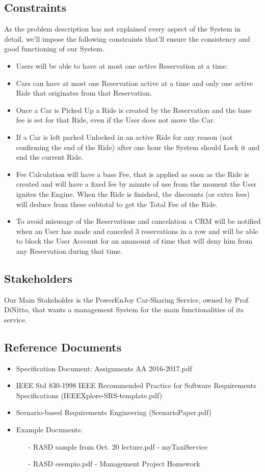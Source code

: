 \documentclass[a4paper]{article}
\begin{document}
\subsection{Constraints}
As the problem description has not explained every aspect of the System in detail, we'll impose the following constraints that'll ensure the consistency and good functioning of our System.
\begin{itemize} 
\item Users will be able to have at most one active Reservation at a time.
\item Cars can have at most one Reservation active at a time and only one active Ride that originates from that Reservation.
\item Once a Car is Picked Up a Ride is created by the Reservation and the base fee is set for that Ride, even if the User does not move the Car.
\item If a Car is left parked Unlocked in an active Ride for any reason (not confirming the end of the Ride) after one hour the System should Lock it and end the current Ride.
\item Fee Calculation will have a base Fee, that is applied as soon as the Ride is created and will have a fixed fee by minute of use from the moment the User ignites the Engine. When the Ride is finished, the discounts (or extra fees) will deduce from these subtotal to get the Total Fee of the Ride.
\item To avoid misusage of the Reservations and cancelation a CRM will be notified when an User has made and canceled 3 reservations in a row and will be able to block the User Account for an ammount of time that will deny him from any Reservation during that time.

\end{itemize}

\subsection{Stakeholders}
Our Main Stakeholder is the PowerEnJoy Car-Sharing Service, owned by Prof. DiNitto, that wants a management System for the main functionalities of its service.

\subsection{Reference Documents}
\begin{itemize}
\item Specification Document: Assignments AA 2016-2017.pdf
\item IEEE Std 830-1998 IEEE Recommended Practice for Software Requirements Specifications (IEEEXplore-SRS-template.pdf)
\item Scenario-based Requirements Engineering (ScenarioPaper.pdf)
\item Example Documents:
\begin{itemize}
\item[-] RASD sample from Oct. 20 lecture.pdf - myTaxiService
\item[-] RASD esempio.pdf - Management Project Homework
\end{itemize}
\end{itemize}
\end{document}
